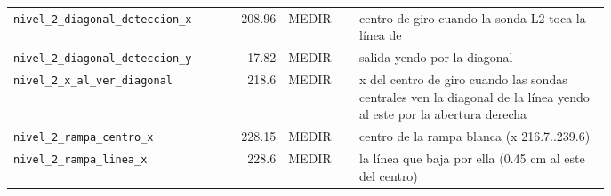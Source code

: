 \begin{longtable}{@{}p{0.36\linewidth}rlp{0.42\linewidth}@{}}
\texttt{nivel\_\allowbreak{}2\_\allowbreak{}diagonal\_\allowbreak{}deteccion\_\allowbreak{}x} & 208.96 & MEDIR & centro de giro cuando la sonda L2 toca la línea de \\
\texttt{nivel\_\allowbreak{}2\_\allowbreak{}diagonal\_\allowbreak{}deteccion\_\allowbreak{}y} & 17.82 & MEDIR & salida yendo por la diagonal \\
\texttt{nivel\_\allowbreak{}2\_\allowbreak{}x\_\allowbreak{}al\_\allowbreak{}ver\_\allowbreak{}diagonal} & 218.6 & MEDIR & x del centro de giro cuando las sondas centrales ven la diagonal de la línea yendo al este por la abertura derecha \\
\texttt{nivel\_\allowbreak{}2\_\allowbreak{}rampa\_\allowbreak{}centro\_\allowbreak{}x} & 228.15 & MEDIR & centro de la rampa blanca (x 216.7..239.6) \\
\texttt{nivel\_\allowbreak{}2\_\allowbreak{}rampa\_\allowbreak{}linea\_\allowbreak{}x} & 228.6 & MEDIR & la línea que baja por ella (0.45 cm al este del centro) \\
\bottomrule\end{longtable}
